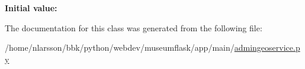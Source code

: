 {\bfseries Initial value\+:}
\begin{DoxyCode}{0}
\DoxyCodeLine{= [}
\DoxyCodeLine{    }
\DoxyCodeLine{    ]}
\end{DoxyCode}


The documentation for this class was generated from the following file\+:\begin{DoxyCompactItemize}
\item 
/home/nlarsson/bbk/python/webdev/museumflask/app/main/\mbox{\hyperlink{admingeoservice_8py}{admingeoservice.\+py}}\end{DoxyCompactItemize}
